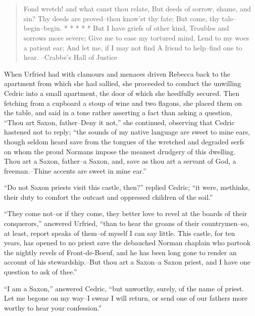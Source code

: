 \chapter{}

\begin{quote}
Fond wretch! and what canst thou relate,
But deeds of sorrow, shame, and sin?
Thy deeds are proved--thou know'st thy fate;
But come, thy tale--begin--begin.
* * * * *
But I have griefs of other kind,
Troubles and sorrows more severe;
Give me to ease my tortured mind,
Lend to my woes a patient ear;
And let me, if I may not find
A friend to help--find one to hear.
--Crabbe's Hall of Justice
\end{quote}

When Urfried had with clamours and menaces driven Rebecca back to the
apartment from which she had sallied, she proceeded to conduct the
unwilling Cedric into a small apartment, the door of which she heedfully
secured. Then fetching from a cupboard a stoup of wine and two flagons,
she placed them on the table, and said in a tone rather asserting a fact
than asking a question, ``Thou art Saxon, father--Deny it not,'' she
continued, observing that Cedric hastened not to reply; ``the sounds of
my native language are sweet to mine ears, though seldom heard save from
the tongues of the wretched and degraded serfs on whom the proud Normans
impose the meanest drudgery of this dwelling. Thou art a Saxon,
father--a Saxon, and, save as thou art a servant of God, a
freeman.--Thine accents are sweet in mine ear.''

``Do not Saxon priests visit this castle, then?'' replied Cedric; ``it
were, methinks, their duty to comfort the outcast and oppressed children
of the soil.''

``They come not--or if they come, they better love to revel at the
boards of their conquerors,'' answered Urfried, ``than to hear the
groans of their countrymen--so, at least, report speaks of them--of
myself I can say little. This castle, for ten years, has opened to no
priest save the debauched Norman chaplain who partook the nightly revels
of Front-de-Boeuf, and he has been long gone to render an account of his
stewardship.--But thou art a Saxon--a Saxon priest, and I have one
question to ask of thee.''

``I am a Saxon,'' answered Cedric, ``but unworthy, surely, of the name
of priest. Let me begone on my way--I swear I will return, or send one
of our fathers more worthy to hear your confession.''

